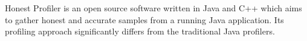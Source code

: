 \documentclass[..thesis.tex]{subfiles}
\begin{document}
Honest Profiler \cite{hon_prof} is an open source software written in Java and C++ which aims to gather honest and accurate samples from a running Java application. 
Its profiling approach significantly differs from the traditional Java profilers.
\end{document}
